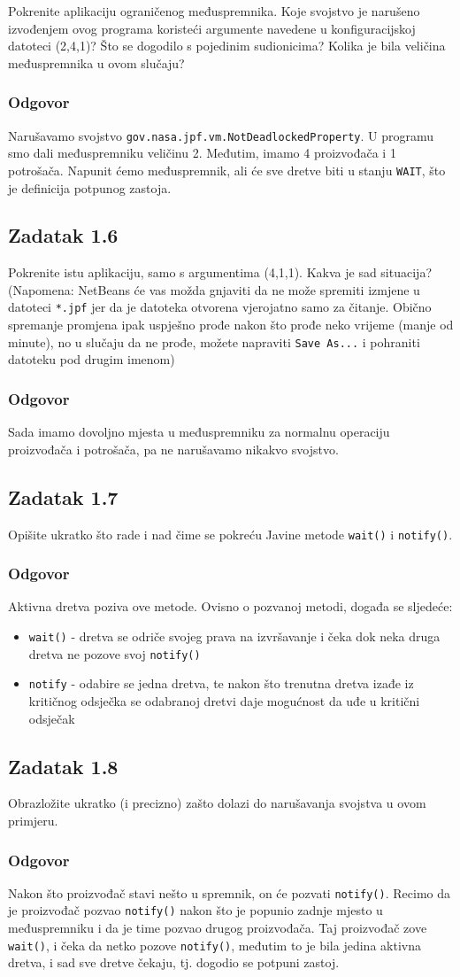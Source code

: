\documentclass{article}
\newcommand{\zadatak}[1]{\subsection{Zadatak #1}}
\newcommand{\odgovor}{\subsubsection*{Odgovor}}
\newcommand{\code}[1]{\colorbox{blue!11}{\texttt{#1}}}
\begin{document}
Pokrenite aplikaciju ograničenog međuspremnika. Koje svojstvo je narušeno izvođenjem ovog programa koristeći argumente navedene u konfiguracijskoj datoteci (2,4,1)? Što se dogodilo s pojedinim sudionicima? Kolika je bila veličina međuspremnika u ovom slučaju?

\odgovor

Narušavamo svojstvo \texttt{gov.nasa.jpf.vm.NotDeadlockedProperty}. U programu smo dali međuspremniku veličinu 2. Međutim, imamo 4 proizvođača i 1 potrošača. Napunit ćemo međuspremnik, ali će sve dretve biti u stanju \texttt{WAIT}, što je definicija potpunog zastoja.

\zadatak{1.6}

Pokrenite istu aplikaciju, samo s argumentima (4,1,1). Kakva je sad situacija? (Napomena: NetBeans će vas možda gnjaviti da ne može spremiti izmjene u datoteci \texttt{*.jpf} jer da je datoteka otvorena vjerojatno samo za čitanje. Obično spremanje promjena ipak uspješno prođe nakon što prođe neko vrijeme (manje od minute), no u slučaju da ne prođe,
možete napraviti \texttt{Save As...} i pohraniti datoteku pod drugim imenom)

\odgovor

Sada imamo dovoljno mjesta u međuspremniku za normalnu operaciju proizvođača i potrošača, pa ne narušavamo nikakvo svojstvo.

\zadatak{1.7}

Opišite ukratko što rade i nad čime se pokreću Javine metode \code{wait()} i \code{notify()}.

\odgovor

Aktivna dretva poziva ove metode. Ovisno o pozvanoj metodi, događa se sljedeće:

\begin{itemize}
    \item \code{wait()} - dretva se odriče svojeg prava na izvršavanje i čeka dok neka druga dretva ne pozove svoj \code{notify()}
    \item \code{notify} - odabire se jedna dretva, te nakon što trenutna dretva izađe iz kritičnog odsječka se odabranoj dretvi daje mogućnost da uđe u kritični odsječak
\end{itemize}

\zadatak{1.8}

Obrazložite ukratko (i precizno) zašto dolazi do narušavanja svojstva u ovom primjeru.

\odgovor

Nakon što proizvođač stavi nešto u spremnik, on će pozvati \code{notify()}. Recimo da je proizvođač pozvao \code{notify()} nakon što je popunio zadnje mjesto u međuspremniku i da je time pozvao drugog proizvođača. Taj proizvođač zove \code{wait()}, i čeka da netko pozove \code{notify()}, međutim to je bila jedina aktivna dretva, i sad sve dretve čekaju, tj. dogodio se potpuni zastoj.
\end{document}
